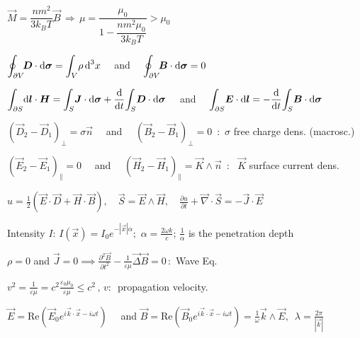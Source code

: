 \item $\vec{M} = \dfrac{ n m^2}{3k_B T} \vec{B} \, \Rightarrow \, \mu = \dfrac{\mu_0}{1-\dfrac{nm^2\mu_0}{3k_BT}} > \mu_0$\\
\squishend
{}
\squishlist
\item $\displaystyle{\oint_{\partial V}} \! \mbox{\boldmath$D$}\cdot\mbox{\boldmath$\textrm{d} \sigma$} = \displaystyle{\int_V} \rho \, \textrm{d} ^3x \quad$ and $\quad \displaystyle{\oint_{\partial V}} \! \mbox{\boldmath$B$}\cdot\mbox{\boldmath$\textrm{d} \sigma$} = 0$

\item $\displaystyle{\int_{\partial S}} \mbox{\boldmath$\textrm{d} l$}\cdot\mbox{\boldmath$H$} = \displaystyle{\int_S} \mbox{\boldmath$J$}\cdot\mbox{\boldmath$\textrm{d} \sigma$} + \frac{\textrm{d} }{\textrm{d} t} \displaystyle{\int_S} \mbox{\boldmath$D$}\cdot\mbox{\boldmath$\textrm{d} \sigma$} \quad $ and  $\quad \displaystyle{\int_{\partial S }} \mbox{\boldmath$E$} \cdot \mbox{\boldmath$\textrm{d} l$} = -\frac{\textrm{d} }{\textrm{d} t} \displaystyle{\int_S} \mbox{\boldmath$B$} \cdot \mbox{\boldmath$\textrm{d} \sigma$}$

\item $(\vec{D}_2 - \vec{D}_1)_{\perp} = \sigma \vec{n} \quad$ and  $\quad (\vec{B}_2 - \vec{B}_1)_{\perp} = 0 \,$ :\, $\sigma$ free charge dens. (macrosc.)

\item $(\vec{E}_2 - \vec{E}_1)_{\parallel} = 0 \quad $ and  $\quad (\vec{H}_2 - \vec{H}_1)_{\parallel} = \vec{K} \wedge \vec{n} \,$ : \, $\vec{K}$ surface current dens.
\squishend
{}
\squishlist

\item $u = \frac{1}{2}(\vec{E}\cdot\vec{D} + \vec{H}\cdot\vec{B}), \quad \vec{S} = \vec{E} \wedge \vec{H}, \quad \frac{\partial u}{\partial t} + \vec{\nabla}\cdot\vec{S} = - \vec{J}\cdot\vec{E}$

\item Intensity $I$: $I(\vec{x})=I_0e^{-|\vec{x}|\alpha}; $ $\alpha=\frac{2\omega k}{c}$; $ \frac{1}{\alpha}$ is the penetration depth
\squishend
{}
\squishlist
\item $\rho = 0$ and  $\vec{J} = 0  \implies  \frac{\partial^2 \vec{B}}{\partial t^2} - \frac{1}{\varepsilon \mu} \vec{\Delta}\vec{B}=0 \, :$  Wave Eq.

\item $v^2 = \frac{1}{\varepsilon\mu} = c^2 \frac{\varepsilon_0\mu_0}{\varepsilon \mu} \leq c^2 \, , \, v : \,$ propagation velocity. 

\item $\vec{E} = \text{Re}\left(\vec{E}_0 e^{i\vec{k}\cdot\vec{x} - i\omega t}\right) \quad $ and  $\vec{B} = \text{Re}\left(\vec{B}_0 e^{i\vec{k}\cdot\vec{x} - i\omega t}\right) = \frac{1}{\omega} \vec{k}\wedge\vec{E} , \, $  $\lambda = \frac{2\pi}{|\vec{k}|}$
\squishend

